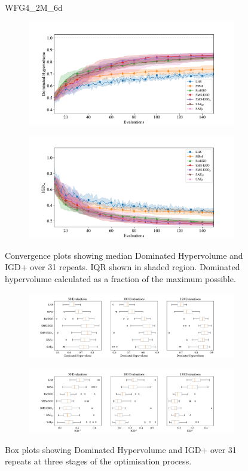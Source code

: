 \documentclass[conference]{IEEEtran}
\begin{document}
\begin{figure}
WFG4\_2M\_6d


\begin{subfigure}[hbt!]{\linewidth}

    \centering
    \includegraphics[width=0.7\linewidth]{figures/wfg4_2obj_6dim_hv_plot.pdf}
\end{subfigure}
\begin{subfigure}[h]{\linewidth}
    \centering
    \includegraphics[width=0.7\linewidth]{figures/wfg4_2obj_6dim_igd_plot.pdf}
\end{subfigure}
    \caption{Convergence plots showing median Dominated Hypervolume and IGD+ over 31 repeats. IQR shown in shaded region. Dominated hypervolume calculated as a fraction of the maximum possible.}
\vspace{\floatsep}
\begin{subfigure}[t]{\linewidth}
    \centering
    \includegraphics[width=0.8\linewidth]{figures/wfg4_2obj_6dim_hv_boxplot.pdf}
\end{subfigure}
\begin{subfigure}[t]{\linewidth}
    \centering
    \includegraphics[width=0.8\linewidth]{figures/wfg4_2obj_6dim_igd_boxplot.pdf}
\end{subfigure}
    \caption{Box plots showing Dominated Hypervolume and IGD+ over 31 repeats at three stages of the optimisation process.}
\end{figure}
\clearpage
\end{document}

